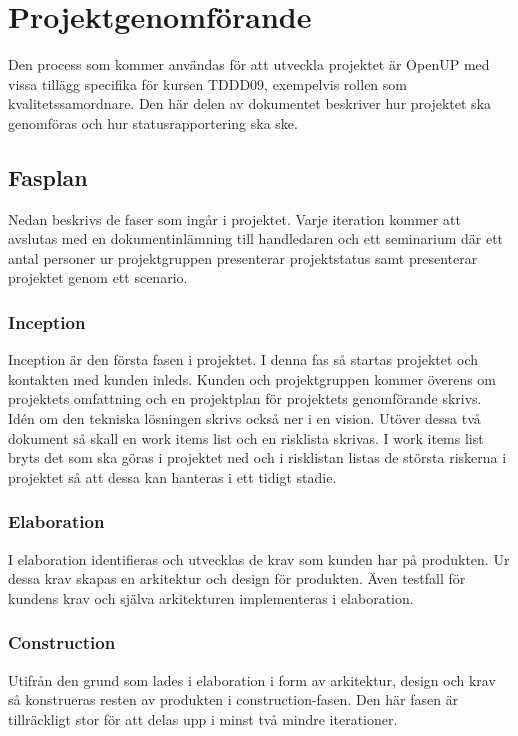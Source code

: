 \section{Projektgenomförande}
Den process som kommer användas för att utveckla projektet är OpenUP\cite{openup} med vissa tillägg specifika för kursen TDDD09, exempelvis rollen som kvalitetssamordnare\cite{sandahl}. Den här delen av dokumentet beskriver hur projektet ska genomföras och hur statusrapportering ska ske.

\subsection{Fasplan}
Nedan beskrivs de faser som ingår i projektet. Varje iteration kommer att avslutas med en dokumentinlämning till handledaren och ett seminarium där ett antal personer ur projektgruppen presenterar projektstatus samt presenterar projektet genom ett scenario.

\subsubsection*{Inception}
Inception är den första fasen i projektet. I denna fas så startas projektet och kontakten med kunden inleds. Kunden och projektgruppen kommer överens om projektets omfattning och en projektplan för projektets genomförande skrivs. Idén om den tekniska lösningen skrivs också ner i en vision. Utöver dessa två dokument så skall en work items list och en risklista skrivas. I work items list bryts det som ska göras i projektet ned och i risklistan listas de största riskerna i projektet så att dessa kan hanteras i ett tidigt stadie.

\subsubsection*{Elaboration}
I elaboration identifieras och utvecklas de krav som kunden har på produkten. Ur dessa krav skapas en arkitektur och design för produkten. Även testfall för kundens krav och själva arkitekturen implementeras i elaboration.

\subsubsection*{Construction}
Utifrån den grund som lades i elaboration i form av arkitektur, design och krav så konstrueras resten av produkten i construction-fasen. Den här fasen är tillräckligt stor för att delas upp i minst två mindre iterationer. %

